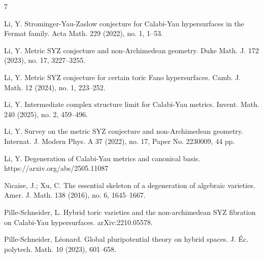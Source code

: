 \documentclass[a4paper]{article}
\theoremstyle{definition}
\begin{document}
\begin{thebibliography}{7}
			
			Li, Y. Strominger-Yau-Zaslow conjecture for Calabi-Yau hypersurfaces in the Fermat family. Acta Math. 229 (2022), no. 1, 1--53. 
			
			
			
			
			
			
			
			 Li, Y. Metric SYZ conjecture and non-Archimedean geometry. Duke Math. J. 172 (2023), no. 17, 3227--3255.
			
			

			
			
			
			  Li, Y. Metric SYZ conjecture for certain toric Fano hypersurfaces. Camb. J. Math. 12 (2024), no. 1, 223--252.
			
			
			
			

	
Li, Y. Intermediate complex structure limit for Calabi-Yau metrics. Invent. Math. 240 (2025), no. 2, 459--496.


			
Li, Y. Survey on the metric SYZ conjecture and non-Archimedean geometry. Internat. J. Modern Phys. A 37 (2022), no. 17, Paper No. 2230009, 44 pp.
			
			
			
					
				Li, Y.	Degeneration of Calabi-Yau metrics and canonical basis. https://arxiv.org/abs/2505.11087
				
				
			
			Nicaise, J.; Xu, C. The essential skeleton of a degeneration of algebraic varieties. Amer. J. Math. 138 (2016), no. 6, 1645--1667.
			
			
			
			
			
			
			
			Pille-Schneider, L. Hybrid toric varieties and the non-archimedean SYZ fibration on Calabi-Yau hypersurfaces.  	arXiv:2210.05578. 
			
			
			
			
			Pille-Schneider, Léonard. Global pluripotential theory on hybrid spaces. J. Éc. polytech. Math. 10 (2023), 601--658.
			

\end{thebibliography}
\end{document}
